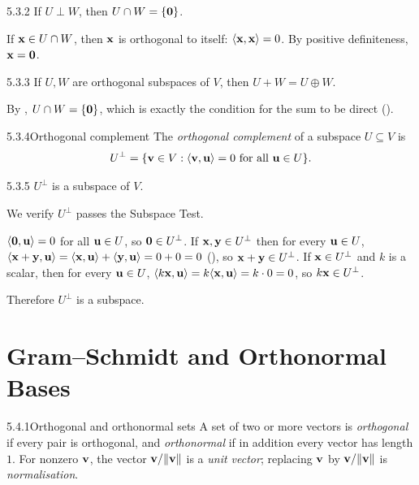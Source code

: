 \begin{lems}{5.3.2}{}
If $U\perp W$, then $U\cap W=\{\mathbf{0}\}$.
\end{lems}

\begin{prf}
If $\mathbf{x}\in U\cap W$, then $\mathbf{x}$ is orthogonal to itself: $\langle \mathbf{x}, \mathbf{x} \rangle=0$. By positive definiteness, $\mathbf{x}=\mathbf{0}$.
\end{prf}

\begin{cors}{5.3.3}{}
If $U,W$ are orthogonal subspaces of $V$, then $U+W=U\oplus W$.
\end{cors}

\begin{prf}
By , $U\cap W=\{\mathbf{0}\}$, which is exactly the condition for the sum to be direct ().
\end{prf}

\begin{defns}{5.3.4}{Orthogonal complement}
The \emph{orthogonal complement} of a subspace $U\subseteq V$ is
\[
U^\perp=\{\mathbf{v}\in V:\langle \mathbf{v}, \mathbf{u} \rangle=0\text{ for all }\mathbf{u}\in U\}.
\]
\end{defns}

\begin{lems}{5.3.5}{}
$U^\perp$ is a subspace of $V$.
\end{lems}

\begin{prf}
We verify $U^\perp$ passes the Subspace Test.
\begin{checks}
 $\langle \mathbf{0}, \mathbf{u} \rangle=0$ for all $\mathbf{u}\in U$, so $\mathbf{0}\in U^\perp$.
 If $\mathbf{x},\mathbf{y}\in U^\perp$ then for every $\mathbf{u}\in U$, $\langle \mathbf{x}+\mathbf{y}, \mathbf{u} \rangle=\langle \mathbf{x}, \mathbf{u} \rangle+\langle \mathbf{y}, \mathbf{u} \rangle=0+0=0$ (), so $\mathbf{x}+\mathbf{y}\in U^\perp$.
 If $\mathbf{x}\in U^\perp$ and $k$ is a scalar, then for every $\mathbf{u}\in U$, $\langle k\mathbf{x}, \mathbf{u} \rangle=k\langle \mathbf{x}, \mathbf{u} \rangle=k\cdot0=0$, so $k\mathbf{x}\in U^\perp$.
\end{checks}
Therefore $U^\perp$ is a subspace.
\end{prf}

\section{Gram--Schmidt and Orthonormal Bases}
\label{sec:5.4}

\begin{defns}{5.4.1}{Orthogonal and orthonormal sets}
A set of two or more vectors is \emph{orthogonal} if every pair is orthogonal, and \emph{orthonormal} if in addition every vector has length $1$. For nonzero $\mathbf{v}$, the vector $\mathbf{v}/\lVert \mathbf{v} \rVert$ is a \emph{unit vector}; replacing $\mathbf{v}$ by $\mathbf{v}/\lVert \mathbf{v} \rVert$ is \emph{normalisation}.
\end{defns}

